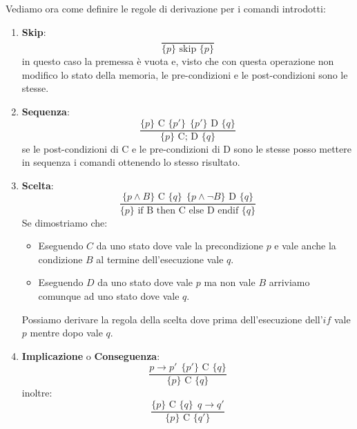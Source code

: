 Vediamo ora come definire le regole di derivazione per i comandi introdotti:
\begin{enumerate}
    \item \textbf{Skip}:
          \begin{equation}
              \frac{}{\{p\} \text{ skip } \{p\}}
          \end{equation}
          in questo caso la premessa è vuota e, visto che con questa operazione
          non modifico lo stato della memoria, le pre-condizioni e le
          post-condizioni sono le stesse.
    \item \textbf{Sequenza}:
          \begin{equation}
              \frac{\{p\} \text{ C } \{p'\} \ \ \{p'\} \text{ D } \{q\}}{\{p\}
                  \text{ C; D } \{q\}}
          \end{equation}
          se le post-condizioni di C e le pre-condizioni di D sono le stesse
          posso mettere in sequenza i comandi ottenendo lo stesso risultato.
    \item \textbf{Scelta}:
          \begin{equation}
              \frac{\{p \land B\} \text{ C } \{q\} \ \ \{p \land \lnot B\}
                  \text{ D } \{q\}}{\{p\} \text{ if B then C else D endif } \{q\}}
          \end{equation}
          Se dimostriamo che:
          \begin{itemize}
              \item Eseguendo $C$ da uno stato dove vale la precondizione $p$ e
                    vale anche la condizione $B$ al termine dell'esecuzione vale
                    $q$.
              \item Eseguendo $D$ da uno stato dove vale $p$ ma non vale $B$
                    arriviamo comunque ad uno stato dove vale $q$.
          \end{itemize}
          Possiamo derivare la regola della scelta dove prima dell'esecuzione
          dell'$if$ vale $p$ mentre dopo vale $q$.
    \item \textbf{Implicazione} o \textbf{Conseguenza}:
          \begin{equation}
              \frac{p \to p' \ \ \{p'\} \text{ C } \{q\}}{\{p\} \text{ C } \{q\}}
          \end{equation}
          inoltre:
          \begin{equation}
              \frac{\{p\} \text{ C } \{q\} \ \ q \to q'}{\{p\} \text{ C } \{q'\}}
          \end{equation}

\end{enumerate}
